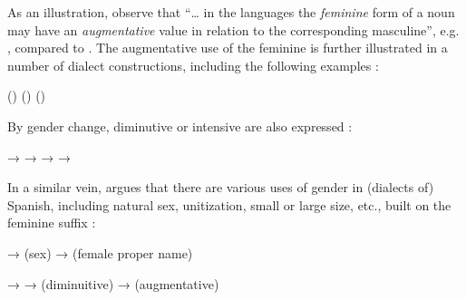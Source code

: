 As an illustration, \citet[135]{KahaneEtAl1949} observe that ``\dots{} in the
 languages the \emph{feminine} form of a noun may have an
\emph{augmentative} value in relation to the corresponding masculine'', e.g.
, compared to . The augmentative use of
the feminine is further illustrated in a number of  dialect
constructions, including the following examples \citet[138]{KahaneEtAl1949}:

\begin{exe}
  \ex\label{ex:fassi:67}
  \begin{xlist}
    \ex\label{ex:fassi:67a}  ()
    \ex\label{ex:fassi:67b}  ()
    \ex\label{ex:fassi:67c}  ()
  \end{xlist}
\end{exe}

By gender change, diminutive or intensive are also expressed \citep[139--141]{KahaneEtAl1949}:

\begin{exe}
  \ex\label{ex:fassi:68}
  \begin{xlist}
    \ex\label{ex:fassi:68a}  → 
    \ex\label{ex:fassi:68b}  → 
    \ex\label{ex:fassi:68c}  → 
    \ex\label{ex:fassi:68d}  → 
  \end{xlist}
\end{exe}

In a similar vein, \citet{Bergen1980} argues that there are various 
uses of gender in (dialects of) Spanish, including natural sex, unitization,
small or large size, etc., built on the feminine suffix  \citep[49--50;
53; 56]{Bergen1980}:

\begin{exe}
  \ex\label{ex:fassi:69}
  \begin{xlist}
    \ex\label{ex:fassi:69a}  →  (sex)
    \ex\label{ex:fassi:69b}  →  (female proper name)
  \end{xlist}
  \ex\label{ex:fassi:70}  → 
  \ex\label{ex:fassi:71}  →  (diminuitive)
  \ex\label{ex:fassi:72}  →  (augmentative)
\end{exe}

